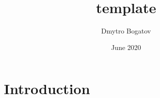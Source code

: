 \documentclass{article}
\title{template}
\author{Dmytro Bogatov}
\date{June 2020}
\begin{document}
\maketitle

\section{Introduction}
\end{document}
